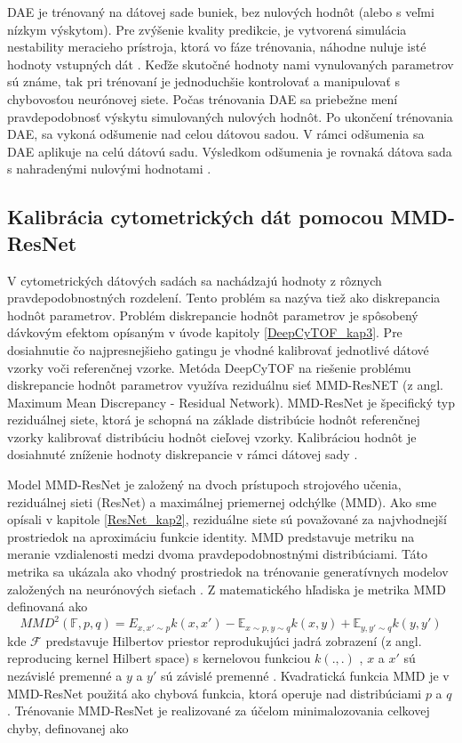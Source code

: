 DAE je trénovaný na dátovej sade buniek, bez nulových hodnôt (alebo s veľmi nízkym výskytom). Pre zvýšenie kvality predikcie, je vytvorená simulácia nestability meracieho prístroja, ktorá vo fáze trénovania, náhodne nuluje isté hodnoty vstupných dát \cite{Li2017}. Keďže skutočné hodnoty nami vynulovaných parametrov sú známe, tak pri trénovaní je jednoduchšie kontrolovať a manipulovať s chybovosťou neurónovej siete. Počas trénovania DAE sa priebežne mení pravdepodobnosť výskytu simulovaných nulových hodnôt. Po ukončení trénovania DAE, sa vykoná odšumenie nad celou dátovou sadou. V rámci odšumenia sa DAE aplikuje na celú dátovú sadu. Výsledkom odšumenia je rovnaká dátova sada s nahradenými nulovými hodnotami \cite{Li2017}.

\subsection{Kalibrácia cytometrických dát pomocou MMD-ResNet}
\label{kalibracia_dat}

V cytometrických dátových sadách sa nachádzajú hodnoty z rôznych pravdepodobnostných rozdelení. Tento problém sa nazýva tiež ako diskrepancia hodnôt parametrov. Problém diskrepancie hodnôt parametrov je spôsobený dávkovým efektom opísaným v úvode kapitoly \ref{DeepCyTOF_kap3}.
Pre dosiahnutie čo najpresnejšieho gatingu je vhodné kalibrovať jednotlivé dátové vzorky voči referenčnej vzorke. Metóda DeepCyTOF na riešenie problému diskrepancie hodnôt parametrov využíva reziduálnu sieť MMD-ResNET (z angl. Maximum Mean Discrepancy - Residual Network). MMD-ResNet je špecifický typ reziduálnej siete, ktorá je schopná na základe distribúcie hodnôt referenčnej vzorky kalibrovať distribúciu hodnôt cieľovej vzorky. Kalibráciou hodnôt je dosiahnuté zníženie hodnoty diskrepancie v rámci dátovej sady \cite{Li2017}.

Model MMD-ResNet je založený na dvoch prístupoch strojového učenia, reziduálnej sieti (ResNet) a maximálnej priemernej odchýlke (MMD). Ako sme opísali v kapitole \ref{ResNet_kap2}, reziduálne siete sú považované za najvhodnejší prostriedok na aproximáciu funkcie identity. MMD predstavuje metriku na meranie vzdialenosti medzi dvoma pravdepodobnostnými distribúciami. Táto metrika sa ukázala ako vhodný prostriedok na trénovanie generatívnych modelov založených na neurónových sieťach \cite{Li2017, Li2016, He2016, Wu2017}. Z matematického hľadiska je metrika MMD definovaná ako
\begin{equation}
    MMD^2 (\mathbb{F},p,q)=\mathrm{}{E}_{x,x'\sim p}k(x,x') - \mathbb{E}_{x\sim p,y\sim q}k(x,y) + \mathbb{E}_{y,y'\sim q}k(y,y')
\end{equation}
kde $\mathcal{F}$ predstavuje Hilbertov priestor \cite{HilbSpace, Alvarez2012} reprodukujúci jadrá zobrazení (z angl. reproducing kernel Hilbert space) s kernelovou funkciou $k(.,.)$ \cite{Alvarez2012}, $x$ a $x'$ sú nezávislé premenné a $y$ a $y'$ sú závislé premenné \cite{Li2017}. Kvadratická funkcia MMD je v MMD-ResNet použitá ako chybová funkcia, ktorá operuje nad distribúciami $p$ a $q$ \cite{Li2017}. Trénovanie MMD-ResNet je realizované za účelom minimalozovania celkovej chyby, definovanej ako

